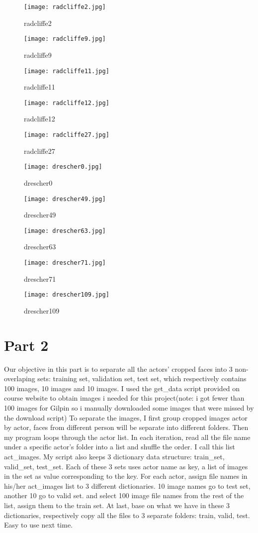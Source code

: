 \documentclass{article}
\begin{document}
\begin{figure}[!htb]
  \texttt{[image: radcliffe2.jpg]}
  \caption*{radcliffe2}\label{fig:hader}
\endminipage\hfill
{}
  \texttt{[image: radcliffe9.jpg]}
  \caption*{radcliffe9}\label{fig:hader}
\endminipage\hfill
{}
  \texttt{[image: radcliffe11.jpg]}
  \caption*{radcliffe11}\label{fig:hader}
\endminipage\hfill
{}
  \texttt{[image: radcliffe12.jpg]}
  \caption*{radcliffe12}\label{fig:hader}
\endminipage\hfill
{}
  \texttt{[image: radcliffe27.jpg]}
  \caption*{radcliffe27}\label{fig:hader}
\endminipage
\end{figure}

\begin{figure}[!htb]
  \texttt{[image: drescher0.jpg]}
  \caption*{drescher0}\label{fig:hader}
\endminipage\hfill
{}
  \texttt{[image: drescher49.jpg]}
  \caption*{drescher49}\label{fig:hader}
\endminipage\hfill
{}
  \texttt{[image: drescher63.jpg]}
  \caption*{drescher63}\label{fig:hader}
\endminipage\hfill
{}
  \texttt{[image: drescher71.jpg]}
  \caption*{drescher71}\label{fig:hader}
\endminipage\hfill
{}
  \texttt{[image: drescher109.jpg]}
  \caption*{drescher109}\label{fig:hader}
\endminipage
\end{figure}

\vspace*{2cm}
\section*{Part 2}
Our objective in this part is to separate all the actors' cropped faces into 3 non-overlaping sets: training set, validation set, test set, which respectively contains 100 images, 10 images and 10 images. I used the get\_data script provided on course website to obtain images i needed for this project(note: i got fewer than 100 images for Gilpin so i manually downloaded some images that were missed by the download script) 
To separate the images, I first group cropped images actor by actor, faces from different person will be separate into different folders. Then my program loops through the actor list. In each iteration, read all the file name under a specific actor's folder into a list and shuffle the order. I call this list act\_images. My script also keeps 3 dictionary data structure: train\_set, valid\_set, test\_set. Each of these 3 sets uses actor name as key, a list of images in the set as value corresponding to the key. For each actor, assign file names in his/her act\_images list to 3 different dictionaries. 10 image names go to test set, another 10 go to valid set. and select 100 image file names from the rest of the list, assign them to the train set. At last, base on what we have in these 3 dictionaries, respectively copy all the files to 3 separate folders: train, valid, test. Easy to use next time.
\end{document}

